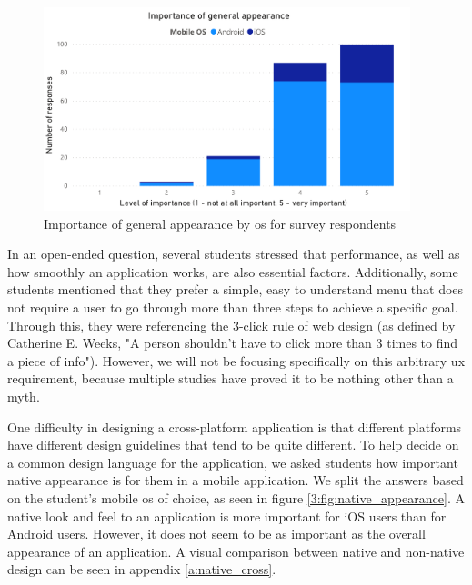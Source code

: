 \begin{figure}[ht]
    \centering
         \includegraphics[width=0.95\textwidth]{figures/charts/survey/appearance.pdf}
    \caption{Importance of general appearance by \acrshort{os} for survey respondents}
    \label{3:fig:appearance}
\end{figure}

In an open-ended question, several students stressed that performance, as well as how smoothly an application works, are also essential factors. Additionally, some students mentioned that they prefer a simple, easy to understand menu that does not require a user to go through more than three steps to achieve a specific goal. Through this, they were referencing the 3-click rule of web design (as defined by Catherine E. Weeks\cite{weeks1997design}, "A person shouldn't have to click more than 3 times to find a piece of info"). However, we will not be focusing specifically on this arbitrary \acrshort{ux} requirement, because multiple studies\cite{porter2003testing}\cite{nielsen2006prioritizing} have proved it to be nothing other than a myth.

One difficulty in designing a cross-platform application is that different platforms have different design guidelines that tend to be quite different\cite{thirumala2017interaction}. To help decide on a common design language for the application, we asked students how important native appearance is for them in a mobile application. We split the answers based on the student's mobile \acrshort{os} of choice, as seen in figure \ref{3:fig:native_appearance}. A native look and feel to an application is more important for iOS users than for Android users. However, it does not seem to be as important as the overall appearance of an application. A visual comparison between native and non-native design can be seen in appendix \ref{a:native_cross}.

